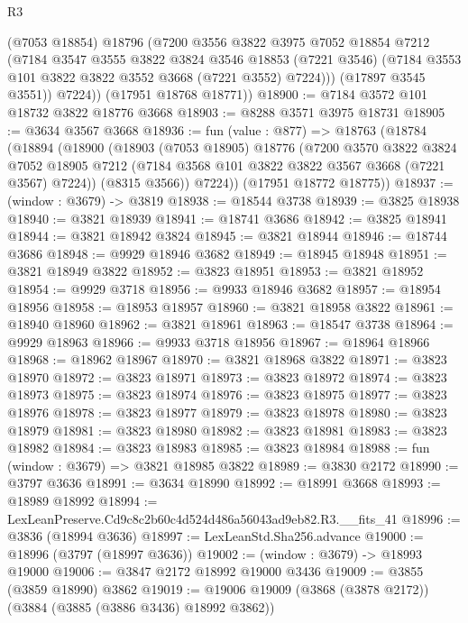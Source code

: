 \begin{lexlean}{R3}
\begin{coremodule}
            (@7053 @18854)
            @18796
            (@7200
              @3556
              @3822
              @3975
              @7052
              @18854
              @7212
              (@7184
                @3547
                @3555
                @3822
                @3824
                @3546
                @18853
                (@7221 @3546)
                (@7184 @3553 @101 @3822 @3822 @3552 @3668 (@7221 @3552) @7224)))
            (@17897 @3545 @3551))
          @7224))
      (@17951 @18768 @18771))
@18900 := @7184 @3572 @101 @18732 @3822 @18776 @3668
@18903 := @8288 @3571 @3975 @18731
@18905 := @3634 @3567 @3668
@18936 := fun (value : @877) =>
  @18763
    (@18784
      (@18894
        (@18900
          (@18903
            (@7053 @18905)
            @18776
            (@7200
              @3570
              @3822
              @3824
              @7052
              @18905
              @7212
              (@7184 @3568 @101 @3822 @3822 @3567 @3668 (@7221 @3567) @7224))
            (@8315 @3566))
          @7224))
      (@17951 @18772 @18775))
@18937 := (window : @3679) -> @3819
@18938 := @18544 @3738
@18939 := @3825 @18938
@18940 := @3821 @18939
@18941 := @18741 @3686
@18942 := @3825 @18941
@18944 := @3821 @18942 @3824
@18945 := @3821 @18944
@18946 := @18744 @3686
@18948 := @9929 @18946 @3682
@18949 := @18945 @18948
@18951 := @3821 @18949 @3822
@18952 := @3823 @18951
@18953 := @3821 @18952
@18954 := @9929 @3718
@18956 := @9933 @18946 @3682
@18957 := @18954 @18956
@18958 := @18953 @18957
@18960 := @3821 @18958 @3822
@18961 := @18940 @18960
@18962 := @3821 @18961
@18963 := @18547 @3738
@18964 := @9929 @18963
@18966 := @9933 @3718 @18956
@18967 := @18964 @18966
@18968 := @18962 @18967
@18970 := @3821 @18968 @3822
@18971 := @3823 @18970
@18972 := @3823 @18971
@18973 := @3823 @18972
@18974 := @3823 @18973
@18975 := @3823 @18974
@18976 := @3823 @18975
@18977 := @3823 @18976
@18978 := @3823 @18977
@18979 := @3823 @18978
@18980 := @3823 @18979
@18981 := @3823 @18980
@18982 := @3823 @18981
@18983 := @3823 @18982
@18984 := @3823 @18983
@18985 := @3823 @18984
@18988 := fun (window : @3679) => @3821 @18985 @3822
@18989 := @3830 @2172
@18990 := @3797 @3636
@18991 := @3634 @18990
@18992 := @18991 @3668
@18993 := @18989 @18992
@18994 := LexLeanPreserve.Cd9c8c2b60c4d524d486a56043ad9eb82.R3.__fits_41
@18996 := @3836 (@18994 @3636)
@18997 := LexLeanStd.Sha256.advance
@19000 := @18996 (@3797 (@18997 @3636))
@19002 := (window : @3679) -> @18993 @19000
@19006 := @3847 @2172 @18992 @19000 @3436
@19009 := @3855 (@3859 @18990) @3862
@19019 := @19006 @19009 (@3868 (@3878 @2172)) (@3884 (@3885 (@3886 @3436) @18992 @3862))

\end{coremodule}
\end{lexlean}
